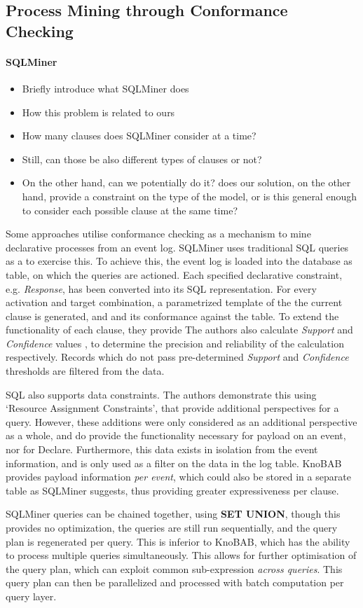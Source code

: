 \subsection{Process Mining through Conformance Checking}
\paragraph*{SQLMiner}
\begin{itemize}
	\item{Briefly introduce what SQLMiner does}
	\item{How this problem is related to ours}
	\item{How many clauses does SQLMiner consider at a time?}
	\item{Still, can those be also different types of clauses or not?}
	\item{On the other hand, can we potentially do it? does our solution, on the other hand, provide a constraint on the type of the model, or is this general enough to consider each possible clause at the same time?}
\end{itemize}
Some approaches utilise conformance checking as a mechanism to mine declarative processes from an event log. SQLMiner \cite{SchonigRCJM16} uses traditional SQL queries \cite{Schonig15} as a to exercise this. To achieve this, the event log is loaded into the database as table, on which the queries are actioned. Each specified declarative constraint, e.g. \emph{Response}, has been converted into its SQL representation. For every activation and target combination, a parametrized template of the the current clause is generated, and and its conformance against the table. To extend the functionality of each clause, they provide  The authors also calculate \emph{Support} and \emph{Confidence} values \cite{DiCiccio2015}, to determine the precision and reliability of the calculation respectively. Records which do not pass pre-determined \emph{Support} and \emph{Confidence} thresholds are filtered from the data. 

SQL also supports data constraints. The authors demonstrate this using `Resource Assignment Constraints', that provide additional perspectives for a query. However, these additions were only considered as an additional perspective as a whole, and do provide the functionality necessary for payload on an event, nor for Declare. Furthermore, this data exists in isolation from the event information, and is only used as a filter on the data in the log table. KnoBAB provides payload information \emph{per event}, which could also be stored in a separate table as SQLMiner suggests, thus providing greater expressiveness per clause.

SQLMiner queries can be chained together, using {\bf SET UNION}, though this provides no optimization, the queries are still run sequentially, and the query plan is regenerated per query. This is inferior to KnoBAB, which has the ability to process multiple queries simultaneously. This allows for further optimisation of the query plan, which can exploit common sub-expression \emph{across queries}. This query plan can then be parallelized and processed with batch computation per query layer.
